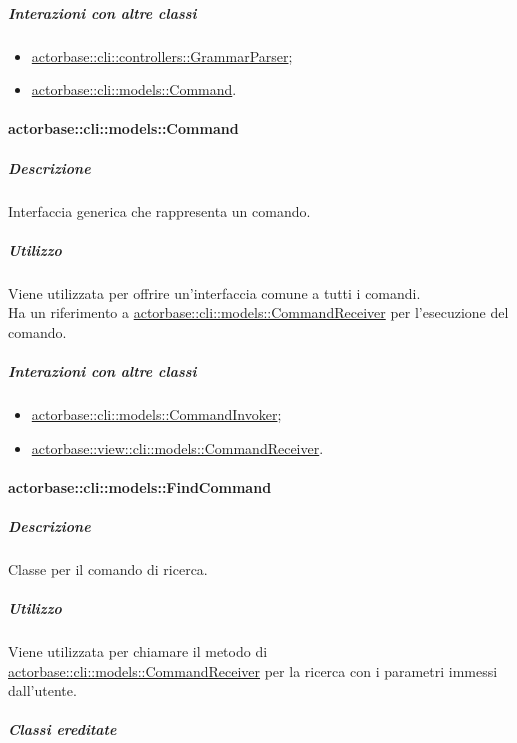 \documentclass{scalatekids-article}
\begin{document}
\subparagraph{Interazioni con altre classi}

\begin{itemize}
\item \hyperref[sec:actorbase::cli::controllers::GrammarParser]{actorbase::cli::controllers::GrammarParser};
\item \hyperref[sec:actorbase::cli::models::Command]{actorbase::cli::models::Command}.
\end{itemize}

\paragraph{actorbase::cli::models::Command}
\label{sec:actorbase::cli::models::Command}

\subparagraph{Descrizione}

Interfaccia generica che rappresenta un comando.

\subparagraph{Utilizzo}

Viene utilizzata per offrire un'interfaccia comune a tutti i comandi.\\Ha un
riferimento a \hyperref[sec:actorbase::cli::models::CommandReceiver]{actorbase::cli::models::CommandReceiver} per l'esecuzione del
comando.

\subparagraph{Interazioni con altre classi}

\begin{itemize}
\item \hyperref[sec:actorbase::cli::models::CommandInvoker]{actorbase::cli::models::CommandInvoker};
\item \hyperref[sec:actorbase::view::cli::models::CommandReceiver]{actorbase::view::cli::models::CommandReceiver}.
\end{itemize}

\paragraph{actorbase::cli::models::FindCommand}
\label{sec:actorbase::cli::models::FindCommand}

\subparagraph{Descrizione}

Classe per il comando di ricerca.

\subparagraph{Utilizzo}

Viene utilizzata per chiamare il metodo di
\hyperref[sec:actorbase::cli::models::CommandReceiver]{actorbase::cli::models::CommandReceiver} per la ricerca con i parametri immessi
dall'utente.

\subparagraph{Classi ereditate}
\end{document}
